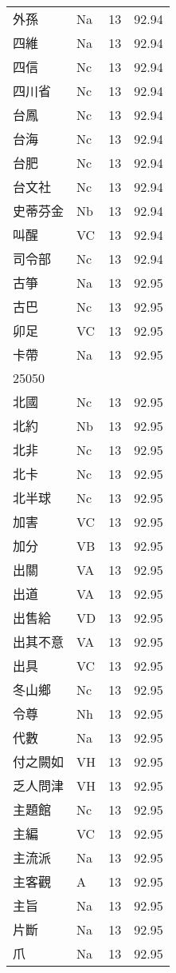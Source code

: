 \documentclass[twocolumn]{book}
\begin{document}
\begin{supertabular}{llrr}
外孫 & Na & 13 &  92.94\\
四維 & Na & 13 &  92.94\\
四信 & Nc & 13 &  92.94\\
四川省 & Nc & 13 &  92.94\\
台鳳 & Nc & 13 &  92.94\\
台海 & Nc & 13 &  92.94\\
台肥 & Nc & 13 &  92.94\\
台文社 & Nc & 13 &  92.94\\
史蒂芬金 & Nb & 13 &  92.94\\
叫醒 & VC & 13 &  92.94\\
司令部 & Nc & 13 &  92.94\\
古箏 & Na & 13 &  92.95\\
古巴 & Nc & 13 &  92.95\\
卯足 & VC & 13 &  92.95\\
卡帶 & Na & 13 &  92.95\\
25050\\
北國 & Nc & 13 &  92.95\\
北約 & Nb & 13 &  92.95\\
北非 & Nc & 13 &  92.95\\
北卡 & Nc & 13 &  92.95\\
北半球 & Nc & 13 &  92.95\\
加害 & VC & 13 &  92.95\\
加分 & VB & 13 &  92.95\\
出關 & VA & 13 &  92.95\\
出道 & VA & 13 &  92.95\\
出售給 & VD & 13 &  92.95\\
出其不意 & VA & 13 &  92.95\\
出具 & VC & 13 &  92.95\\
冬山鄉 & Nc & 13 &  92.95\\
令尊 & Nh & 13 &  92.95\\
代數 & Na & 13 &  92.95\\
付之闕如 & VH & 13 &  92.95\\
乏人問津 & VH & 13 &  92.95\\
主題館 & Nc & 13 &  92.95\\
主編 & VC & 13 &  92.95\\
主流派 & Na & 13 &  92.95\\
主客觀 & A & 13 &  92.95\\
主旨 & Na & 13 &  92.95\\
片斷 & Na & 13 &  92.95\\
爪 & Na & 13 &  92.95\\

\end{supertabular}
\end{document}
